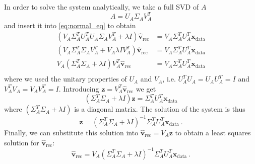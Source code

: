 \documentclass[a4paper]{article}
\begin{document}
In order to solve the system analytically, we take a full SVD of $A$
\begin{equation}
    A = U_A \Sigma_A V_A^T
\end{equation}
and insert it into \eqref{eq:normal_eq} to obtain
\begin{align}
    (V_A\Sigma_A^T U_A^T U_A \Sigma_A V_A^T + \lambda I)\hat{\mathbf{v}}_\mathrm{rec} &= V_A\Sigma_A^T U_A^T \mathbf{x}_\mathrm{data}\\
    \label{eq:unitary}
    (V_A\Sigma_A^T \Sigma_A V_A^T + V_A \lambda I V_A^T)\hat{\mathbf{v}}_\mathrm{rec} &= V_A\Sigma_A^T U_A^T \mathbf{x}_\mathrm{data}\\
    V_A(\Sigma_A^T \Sigma_A + \lambda I) V_A^T \hat{\mathbf{v}}_\mathrm{rec} &= V_A\Sigma_A^T U_A^T \mathbf{x}_\mathrm{data}\\
\end{align}
where we used the unitary properties of $U_A$ and $V_A$, i.e. $U_A^T U_A = U_A U_A^T= I$ and $V_A^T V_A = V_A V_A^T= I$.
Introducing $\mathbf{z} = V_A^T \hat{\mathbf{v}}_\mathrm{rec}$ we get
\begin{equation}
    (\Sigma_A^T \Sigma_A + \lambda I) \mathbf{z} = \Sigma_A^T U_A^T \mathbf{x}_\mathrm{data}
\end{equation}
where $(\Sigma_A^T \Sigma_A + \lambda I)$ is a diagonal matrix. The solution of the system is thus
\begin{equation}
    \mathbf{z} = (\Sigma_A^T \Sigma_A + \lambda I)^{-1} \Sigma_A^T U_A^T \mathbf{x}_\mathrm{data}~.
\end{equation}
Finally, we can substitute this solution into $\hat{\mathbf{v}}_\mathrm{rec} = V_A \mathbf{z}$ to obtain a least squares solution for $\hat{\mathbf{v}}_\mathrm{rec}$:
\begin{equation}
    \hat{\mathbf{v}}_\mathrm{rec} = V_A (\Sigma_A^T \Sigma_A + \lambda I)^{-1} \Sigma_A^T U_A^T \mathbf{x}_\mathrm{data}~.
\end{equation}


\end{document}
